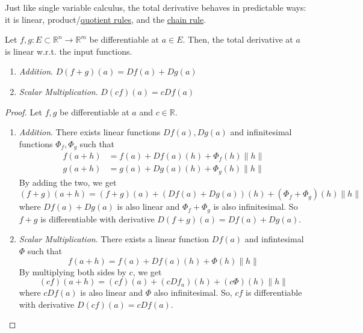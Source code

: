   Just like single variable calculus, the total derivative behaves in predictable ways: it is linear, product/\hyperref[real-thm:quotient_rule]{quotient rules}, and the \hyperref[real-thm:chain]{chain rule}. 

  \begin{lemma}
    \label{thm:linearity-of-total-derivatives}
    Let $f, g: E \subset \mathbb{R}^n \to \mathbb{R}^m$ be differentiable at $a \in E$. Then, the total derivative at $a$ is linear w.r.t. the input functions. 
    \begin{enumerate}
      \item \textit{Addition}. $D (f + g)(a) = D f(a) + D g(a)$ 
      \item \textit{Scalar Multiplication}. $D (c f)(a) = c D f(a)$ 
    \end{enumerate}
  \end{lemma}
	\begin{proof}
		Let $f, g$ be differentiable at $a$ and $c \in \mathbb{R}$. 
		\begin{enumerate}
		  \item \textit{Addition}. There exists linear functions $Df(a), Dg(a)$ and infinitesimal functions $\Phi_f, \Phi_g$ such that 
				\begin{align}
					f(a + h) & = f(a) + Df(a)(h) + \Phi_f (h) \|h\| \\ 
					g(a + h) & = g(a) + Dg(a)(h) + \Phi_g (h) \|h\| 
				\end{align}
				By adding the two, we get 
				\begin{equation}
					(f + g)(a + h) = (f + g)(a) + (Df(a) + Dg(a))(h) + (\Phi_f + \Phi_g) (h) \|h\|
				\end{equation}
				where $Df(a) + Dg(a)$ is also linear and $\Phi_f + \Phi_g$ is also infinitesimal. So $f + g$ is differentiable with derivative $D(f + g)(a) = Df(a) + Dg(a)$. 

			\item \textit{Scalar Multiplication}. There exists a linear function $Df(a)$ and infintesimal $\Phi$ such that 
				\begin{equation}
				  f(a + h) = f(a) + Df(a)(h) + \Phi(h) \|h\|
				\end{equation}
				By multiplying both sides by $c$, we get 
				\begin{equation}
					(cf)(a + h) = (cf)(a) + (cDf_a)(h) + (c\Phi)(h) \|h\|
				\end{equation}
				where $c Df(a)$ is also linear and $\Phi$ also infinitesimal. So, $cf$ is differentiable with derivative $D(cf)(a) = c Df(a)$. 
		\end{enumerate}
	\end{proof}

